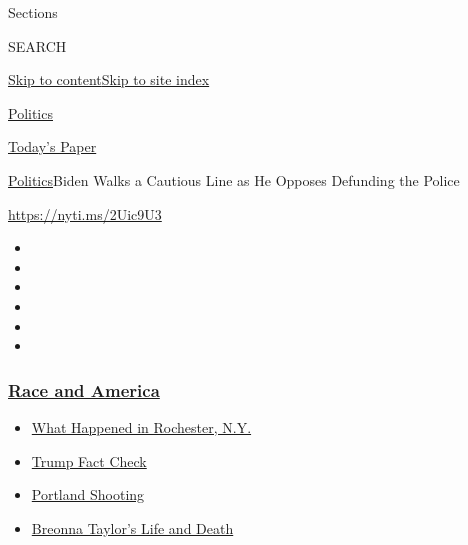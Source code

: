 Sections

SEARCH

\protect\hyperlink{site-content}{Skip to
content}\protect\hyperlink{site-index}{Skip to site index}

\href{https://www.nytimes3xbfgragh.onion/section/politics}{Politics}

\href{https://myaccount.nytimes3xbfgragh.onion/auth/login?response_type=cookie\&client_id=vi}{}

\href{https://www.nytimes3xbfgragh.onion/section/todayspaper}{Today's
Paper}

\href{/section/politics}{Politics}\textbar{}Biden Walks a Cautious Line
as He Opposes Defunding the Police

\url{https://nyti.ms/2Uic9U3}

\begin{itemize}
\item
\item
\item
\item
\item
\item
\end{itemize}

\hypertarget{race-and-america}{%
\subsubsection{\texorpdfstring{\href{https://www.nytimes3xbfgragh.onion/news-event/george-floyd-protests-minneapolis-new-york-los-angeles?name=styln-george-floyd\&region=TOP_BANNER\&block=storyline_menu_recirc\&action=click\&pgtype=Article\&impression_id=93af4c90-f2ab-11ea-aa8b-576dc9f1a157\&variant=undefined}{Race
and America}}{Race and America}}\label{race-and-america}}

\begin{itemize}
\tightlist
\item
  \href{https://www.nytimes3xbfgragh.onion/2020/09/04/nyregion/rochester-police-daniel-prude.html?name=styln-george-floyd\&region=TOP_BANNER\&block=storyline_menu_recirc\&action=click\&pgtype=Article\&impression_id=93af4c91-f2ab-11ea-aa8b-576dc9f1a157\&variant=undefined}{What
  Happened in Rochester, N.Y.}
\item
  \href{https://www.nytimes3xbfgragh.onion/2020/09/01/us/politics/trump-fact-check-protests.html?name=styln-george-floyd\&region=TOP_BANNER\&block=storyline_menu_recirc\&action=click\&pgtype=Article\&impression_id=93af73a0-f2ab-11ea-aa8b-576dc9f1a157\&variant=undefined}{Trump
  Fact Check}
\item
  \href{https://www.nytimes3xbfgragh.onion/2020/08/30/us/portland-shooting-explained.html?name=styln-george-floyd\&region=TOP_BANNER\&block=storyline_menu_recirc\&action=click\&pgtype=Article\&impression_id=93af73a1-f2ab-11ea-aa8b-576dc9f1a157\&variant=undefined}{Portland
  Shooting}
\item
  \href{https://www.nytimes3xbfgragh.onion/2020/08/30/us/breonna-taylor-police-killing.html?name=styln-george-floyd\&region=TOP_BANNER\&block=storyline_menu_recirc\&action=click\&pgtype=Article\&impression_id=93af73a2-f2ab-11ea-aa8b-576dc9f1a157\&variant=undefined}{Breonna
  Taylor's Life and Death}
\end{itemize}

